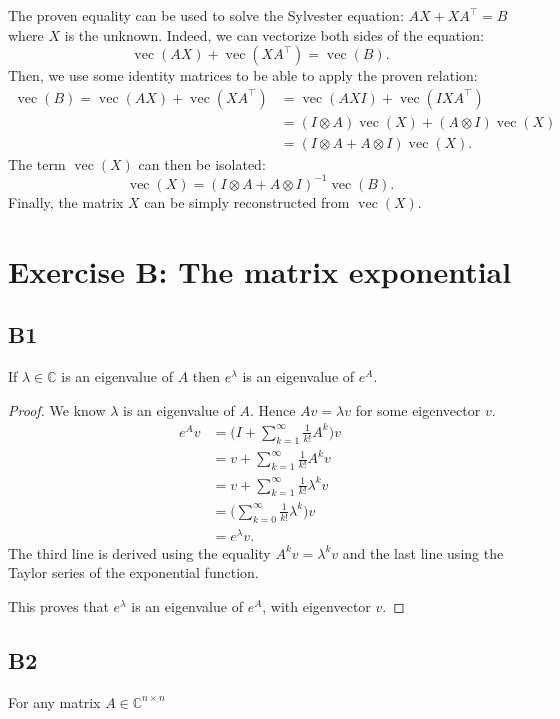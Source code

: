 \documentclass[11pt]{article}
\DeclareMathOperator{\vect}{vec}
\newcommand{\complex}{\mathbb{C}} %
\newcommand{\kp}{\otimes} %
\begin{document}
The proven equality can be used to solve the Sylvester equation: $AX+XA^\top=B$ where $X$ is the unknown.
Indeed, we can vectorize both sides of the equation:
\[
    \vect(AX) + \vect(XA^\top)=\vect(B).
\]
Then, we use some identity matrices to be able to apply the proven relation:
\begin{align*}
    \vect(B) = \vect(AX) + \vect(XA^\top) &= \vect(AXI) + \vect(IXA^\top)\\
    &=(I\kp A)\vect(X) + (A\kp I) \vect(X)\\
    &=(I\kp A + A\kp I) \vect(X).
\end{align*}
The term $\vect(X)$ can then be isolated:
\[
    \vect(X)=(I\kp A + A\kp I)^{-1}\vect(B).
\]
Finally, the matrix \(X\) can be simply reconstructed from $\vect(X)$.

\section{Exercise B: The matrix exponential}
\subsection*{B1}
If $\lambda\in \complex$ is an eigenvalue of \(A\) then $e^\lambda$ is an eigenvalue of $e^A$.
\begin{proof}
We know $\lambda$ is an eigenvalue of \(A\).
Hence $Av=\lambda v$ for some eigenvector $v$.
\begin{align*}
    e^Av&=\Bigg(I+\sum^{\infty}_{k=1}\frac{1}{k!}A^k\Bigg)v\\
    &=v+\sum^{\infty}_{k=1}\frac{1}{k!}A^kv\\
    &=v+\sum^{\infty}_{k=1}\frac{1}{k!}\lambda^kv\\
    &=\Bigg(\sum^{\infty}_{k=0}\frac{1}{k!}\lambda^k\Bigg)v\\
    &=e^\lambda v.
\end{align*}
The third line is derived using the equality $A^kv=\lambda^kv$ and the last line using the Taylor series of the exponential function.

This proves that $e^\lambda$ is an eigenvalue of $e^A$, with eigenvector \(v\).
\end{proof}

\subsection*{B2}
For any matrix $A\in \complex^{n\times n}$
\end{document}
